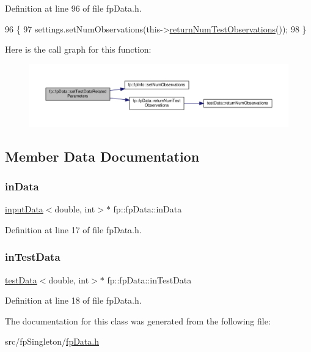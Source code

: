 Definition at line 96 of file fp\+Data.\+h.


\begin{DoxyCode}
96                                                           \{
97                 settings.setNumObservations(this->\hyperlink{classfp_1_1fpData_a9a115d29fafb6e5b941f4e0c860e65e7}{returnNumTestObservations}());
98             \}
\end{DoxyCode}
Here is the call graph for this function\+:\nopagebreak
\begin{figure}[H]
\begin{center}
\leavevmode
\includegraphics[width=350pt]{classfp_1_1fpData_ab60d2098334e253a0bf3115f029c1996_cgraph}
\end{center}
\end{figure}


\subsection{Member Data Documentation}
\mbox{\label{classfp_1_1fpData_a49d7c3f58bcf88843c25b1b0c9714ebe}} 
\subsubsection{\texorpdfstring{in\+Data}{inData}}
{\footnotesize\ttfamily \hyperlink{classinputData}{input\+Data}$<$double, int$>$$\ast$ fp\+::fp\+Data\+::in\+Data\hspace{0.3cm}{\ttfamily [protected]}}



Definition at line 17 of file fp\+Data.\+h.

\mbox{\label{classfp_1_1fpData_ad4f4dd3a8d15633b7f983932fa60bbad}} 
\subsubsection{\texorpdfstring{in\+Test\+Data}{inTestData}}
{\footnotesize\ttfamily \hyperlink{classtestData}{test\+Data}$<$double, int$>$$\ast$ fp\+::fp\+Data\+::in\+Test\+Data\hspace{0.3cm}{\ttfamily [protected]}}



Definition at line 18 of file fp\+Data.\+h.



The documentation for this class was generated from the following file\+:\begin{DoxyCompactItemize}
\item 
src/fp\+Singleton/\hyperlink{fpData_8h}{fp\+Data.\+h}\end{DoxyCompactItemize}
